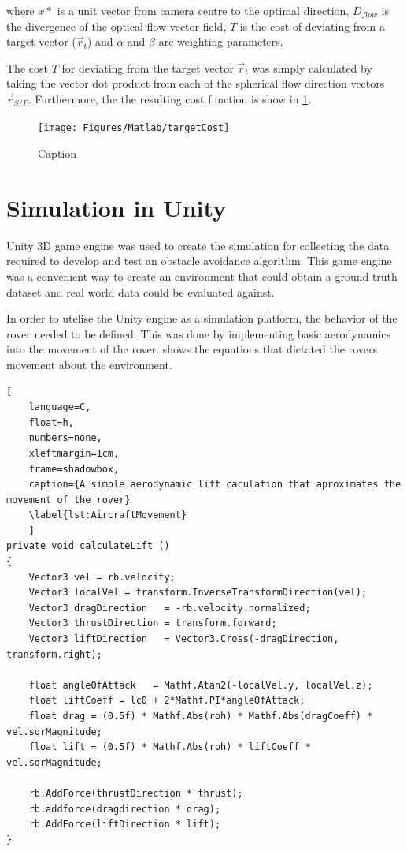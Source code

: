 \documentclass{UoNMCHA}
\numberwithin{equation}{section}
\begin{document}
where $x*$ is a unit vector from camera centre to the optimal direction, $D_{flow}$ is the divergence of the optical flow vector field, $T$ is the cost of deviating from a target vector ($\vec{r}_{t}$) and $\alpha$ and $\beta$ are weighting parameters.

The cost $T$ for deviating from the target vector $\vec{r}_{t}$ was simply calculated by taking the vector dot product from each of the spherical flow direction vectors $\vec{r}_{S/P}$. Furthermore, the  the resulting cost function is show in \cref{fig:targetCost}.
\begin{figure}[ht]
    \begin{center}
        \texttt{[image: Figures/Matlab/targetCost]}
        \caption{Caption}
        \label{fig:targetCost}
    \end{center}
\end{figure}
\newpage
\section{Simulation in Unity}
Unity 3D game engine was used to create the simulation for collecting the data required to develop and test an obstacle avoidance algorithm. This game engine was a convenient way to create an environment that could obtain a ground truth dataset and real world data could be evaluated against.

In order to utelise the Unity engine as a simulation platform, the behavior of the rover needed to be defined. This was done by implementing basic aerodynamics into the movement of the rover.  shows the equations that dictated the rovers movement about the environment.

\begin{lstlisting}[
    language=C,
	float=h,
	numbers=none,
    xleftmargin=1cm,
    frame=shadowbox,
	caption={A simple aerodynamic lift caculation that aproximates the movement of the rover}
	\label{lst:AircraftMovement}
	]
private void calculateLift ()
{
	Vector3 vel = rb.velocity;
	Vector3 localVel = transform.InverseTransformDirection(vel);
	Vector3 dragDirection   = -rb.velocity.normalized;
	Vector3 thrustDirection = transform.forward;
	Vector3 liftDirection   = Vector3.Cross(-dragDirection, transform.right);

	float angleOfAttack   = Mathf.Atan2(-localVel.y, localVel.z);
	float liftCoeff = lc0 + 2*Mathf.PI*angleOfAttack;
	float drag = (0.5f) * Mathf.Abs(roh) * Mathf.Abs(dragCoeff) * vel.sqrMagnitude;
	float lift = (0.5f) * Mathf.Abs(roh) * liftCoeff * vel.sqrMagnitude;

	rb.AddForce(thrustDirection * thrust);
	rb.addforce(dragdirection * drag);
	rb.AddForce(liftDirection * lift);
}
\end{lstlisting}
\end{document}

